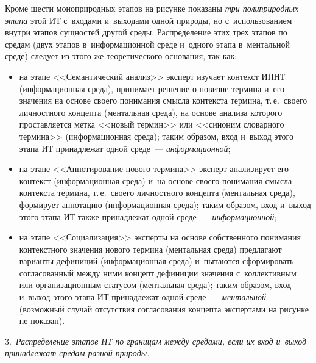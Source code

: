 \begin{multicols}{2}
  Кроме шести моноприродных этапов на рисунке показаны \textit{три 
полиприродных этапа} этой ИТ с~входами и~выходами одной природы, но 
с~использованием внутри этапов сущностей другой среды. Распределение 
этих трех этапов по средам (двух этапов в~информационной среде и~одного 
этапа в~ментальной среде) следует из этого же теоретического основания, так 
как: 
  \begin{itemize}
  \item на этапе <<Семантический анализ>> эксперт изуча\-ет контекст ИПНТ 
(информационная среда), принимает решение о новизне термина и~его 
значения на основе своего понимания смысла контекста термина, т.\,е.\ 
своего личностного концепта (ментальная среда), на основе анализа которого 
проставляется метка <<новый термин>> или <<синоним словарного 
термина>> (информационная среда); таким образом, вход и~выход этого 
этапа ИТ принадлежат одной среде~--- \textit{информационной};
  \item на этапе <<Аннотирование нового термина>> эксперт анализирует 
его контекст (информационная среда) и~на основе своего понимания смыс\-ла 
контекста термина, т.\,е.\ своего личностного концепта (ментальная среда), 
формирует аннотацию (информационная среда); таким образом, вход 
и~выход этого этапа ИТ также принадлежат одной среде~--- 
\textit{информационной};
  \item на этапе <<Социализация>> эксперты на основе собственного 
понимания контекстного значения нового термина (ментальная среда) 
предлагают варианты дефиниций (информационная среда) и~пытаются 
сформировать согласованный между ними концепт дефиниции значения 
с~коллективным или организационным статусом (ментальная среда); таким 
образом, вход и~выход этого этапа ИТ принадлежат одной среде~--- 
\textit{ментальной} (возможный случай отсутствия согласования концепта 
экспертами на рисунке не показан).
  \end{itemize}
  
  3.\ \textit{Распределение этапов ИТ по границам между средами, если их 
вход и~выход принадлежат средам разной природы.}
  

\end{multicols}
